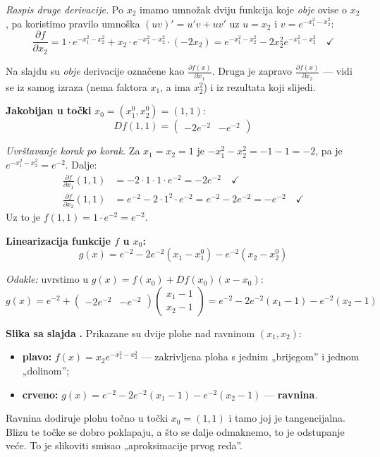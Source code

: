 \emph{Raspis druge derivacije.} Po $x_2$ imamo umnožak dviju funkcija koje
\emph{obje} ovise o $x_2$, pa koristimo pravilo umnoška $(uv)' = u'v + uv'$ uz
$u = x_2$ i $v = e^{-x_1^2-x_2^2}$:
\[
\frac{\partial f}{\partial x_2}
= 1 \cdot e^{-x_1^2-x_2^2} + x_2 \cdot e^{-x_1^2-x_2^2}\cdot(-2x_2)
= e^{-x_1^2-x_2^2} - 2x_2^2e^{-x_1^2-x_2^2}
\quad\checkmark
\]

\begin{napomena}
Na slajdu su \emph{obje} derivacije označene kao
$\frac{\partial f(x)}{\partial x_1}$. Druga je zapravo
$\frac{\partial f(x)}{\partial x_2}$ --- vidi se iz samog izraza (nema faktora
$x_1$, a ima $x_2^2$) i iz rezultata koji slijedi.
\end{napomena}

\textbf{Jakobijan u točki} $x_0 = (x_1^0, x_2^0) = (1,1)$:
\[
Df(1,1) = \begin{pmatrix} -2e^{-2} & -e^{-2} \end{pmatrix}
\]

\emph{Uvrštavanje korak po korak.} Za $x_1 = x_2 = 1$ je
$-x_1^2 - x_2^2 = -1 - 1 = -2$, pa je $e^{-x_1^2-x_2^2} = e^{-2}$. Dalje:
\begin{align}
\frac{\partial f}{\partial x_1}(1,1) &= -2\cdot 1 \cdot 1 \cdot e^{-2}
  = -2e^{-2} \quad\checkmark \\
\frac{\partial f}{\partial x_2}(1,1) &= e^{-2} - 2\cdot 1^2 \cdot e^{-2}
  = e^{-2} - 2e^{-2} = -e^{-2} \quad\checkmark
\end{align}
Uz to je $f(1,1) = 1 \cdot e^{-2} = e^{-2}$.

\textbf{Linearizacija funkcije $f$ u $x_0$:}
\[
g(x) = e^{-2} - 2e^{-2}(x_1 - x_1^0) - e^{-2}(x_2 - x_2^0)
\]

\emph{Odakle:} uvrstimo u $g(x) = f(x_0) + Df(x_0)(x-x_0)$:
\[
g(x) = e^{-2}
+ \begin{pmatrix} -2e^{-2} & -e^{-2}\end{pmatrix}
  \begin{pmatrix} x_1 - 1 \\ x_2 - 1 \end{pmatrix}
= e^{-2} - 2e^{-2}(x_1 - 1) - e^{-2}(x_2 - 1)
\]

\textbf{Slika sa slajda} \textbf{.} Prikazane su dvije plohe nad
ravninom $(x_1, x_2)$:
\begin{itemize}
  \item \textbf{plavo:} $f(x) = x_2e^{-x_1^2-x_2^2}$ --- zakrivljena ploha s
        jednim „brijegom” i jednom „dolinom”;
  \item \textbf{crveno:} $g(x) = e^{-2} - 2e^{-2}(x_1-1) - e^{-2}(x_2-1)$ ---
        \textbf{ravnina}.
\end{itemize}
Ravnina dodiruje plohu točno u točki $x_0 = (1,1)$ i tamo joj je tangencijalna.
Blizu te točke se dobro poklapaju, a što se dalje odmaknemo, to je odstupanje
veće. To je slikoviti smisao „aproksimacije prvog reda”.

